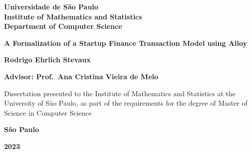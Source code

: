 \begin{titlepage}
\begin{center}


\vspace{1cm}

\textbf{Universidade de São Paulo} \\
\textbf{Institute of Mathematics and Statistics} \\
\textbf{Department of Computer Science}

\vspace{1.5cm}
\textbf{\LARGE A Formalization of a Startup Finance Transaction Model using Alloy}

\vspace{1.5cm}

\textbf{\Large Rodrigo Ehrlich Stevaux}

\vspace{1cm}

\textbf{\Large Advisor: Prof.\ Ana Cristina Vieira de Melo}

\vspace{1cm}
\begin{flushright}
    \begin{minipage}{0.5\textwidth}
        \begin{flushleft}
            Dissertation presented to the Institute of Mathematics and Statistics at the University of São Paulo, as part of the requirements for the degree of Master of Science in Computer Science
        \end{flushleft}
    \end{minipage}
\end{flushright}

\vspace*{\fill}

\textbf{\large São Paulo}

\vspace{0.5cm}
\textbf{\large 2023}

\end{center}
\end{titlepage}

\newpage
\thispagestyle{empty}
\
\newpage